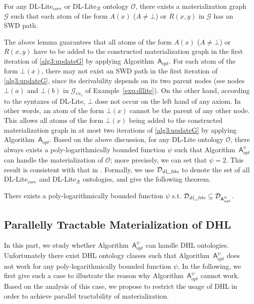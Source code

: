 \begin{lemma}\label{lemma:dllite}
For any DL-Lite$_{core}$ or DL-Lite$_\mathcal{R}$ ontology $\mathcal{O}$, there exists a materialization graph $\mathcal{G}$ such that
each atom of the form $A(x)$ ($A\neq\bot$) or $R(x,y)$ in $\mathcal{G}$ has an SWD path.
\end{lemma}

The above lemma guarantees that all atoms of the form $A(x)$ ($A\neq\bot$) or $R(x,y)$
have to be added to the constructed materialization graph in the first iteration of
\ref{alg3:updateG} by applying Algorithm~$\mathsf{A}_{opt}$.
For each atom of the form $\bot(x)$, there may not exist an SWD path in the first iteration
of \ref{alg3:updateG}, since its derivability depends on its two parent nodes
(see nodes $\bot(a)$ and $\bot(b)$ in $\mathcal{G}_{ex_5}$ of
Example~\ref{exp:dllite}). On the other hand, according to the syntaxes of DL-Lite,
$\bot$ dose not occur on the left hand of any axiom. In other words,
an atom of the form $\bot(x)$ cannot be the parent of any other node.
This allows all atoms of the form $\bot(x)$ being added
to the constructed materialization graph in at most two iterations of
\ref{alg3:updateG} by applying Algorithm~$\mathsf{A}_{opt}$.
Based on the above discussion, for any DL-Lite ontology $\mathcal{O}$,
there always exists a poly-logarithmically bounded function $\psi$ such that
Algorithm~$\mathsf{A}_{opt}^{\psi}$ can handle the materialization of $\mathcal{O}$;
more precisely, we can set that $\psi=2$. This result is consistent with
that in \cite{CalvaneseGLLR07}.
Formally, we use $\mathcal{D}_{\textit{\text{dl\_lite}}}$
to denote the set of all DL-Lite$_{core}$ and DL-Lite$_\mathcal{R}$ ontologies, and give the following theorem.

\begin{theorem}\label{theorem:dl-lite}
There exists a poly-logarithmically bounded function $\psi$ s.t.
$\mathcal{D}_{\textit{\text{dl\_lite}}}\subseteq\mathcal{D}_{\mathsf{A}_{opt}^{\psi}}$.
\end{theorem}


\subsection{Parallelly Tractable Materialization of DHL}
\label{sec:DHL}

In this part, we study whether Algorithm~$\mathsf{A}_{opt}^\psi$ can handle DHL ontologies.
Unfortunately there exist DHL ontology classes such that Algorithm~$\mathsf{A}_{opt}^\psi$
does not work for any poly-logarithmically bounded function $\psi$.
In the following, we first give such a case
to illustrate the reason why Algorithm~$\mathsf{A}_{opt}^\psi$ cannot work.
Based on the analysis of this case, we propose to restrict
the usage of DHL in order to achieve parallel tractability
of materialization.

